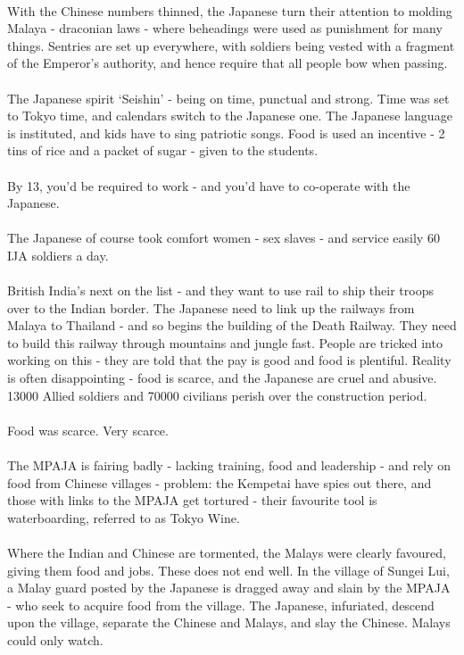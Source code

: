 \documentclass[a4paper]{article}
\begin{document}
\\
With the Chinese numbers thinned, the Japanese turn their attention to molding Malaya - draconian laws - where beheadings were used as punishment for many things. Sentries are set up everywhere, with soldiers being vested with a fragment of the Emperor's authority, and hence require that all people bow when passing.\\
\\
The Japanese spirit `Seishin' - being on time, punctual and strong. Time was set to Tokyo time, and calendars switch to the Japanese one. The Japanese language is instituted, and kids have to sing patriotic songs. Food is used an incentive - 2 tins of rice and a packet of sugar - given to the students.\\
\\
By 13, you'd be required to work - and you'd have to co-operate with the Japanese.\\
\\
The Japanese of course took comfort women - sex slaves - and service easily 60 IJA soldiers a day. \\
\\
British India's next on the list - and they want to use rail to ship their troops over to the Indian border. The Japanese need to link up the railways from Malaya to Thailand - and so begins the building of the Death Railway. They need to build this railway through mountains and jungle fast. People are tricked into working on this - they are told that the pay is good and food is plentiful. Reality is often disappointing - food is scarce, and the Japanese are cruel and abusive. 13000 Allied soldiers and 70000 civilians perish over the construction period.\\
\\
Food was scarce. Very scarce.\\
\\
The MPAJA is fairing badly - lacking training, food and leadership - and rely on food from Chinese villages - problem: the Kempetai have spies out there, and those with links to the MPAJA get tortured - their favourite tool is waterboarding, referred to as Tokyo Wine.\\
\\
Where the Indian and Chinese are tormented, the Malays were clearly favoured, giving them food and jobs. These does not end well. In the village of Sungei Lui, a Malay guard posted by the Japanese is dragged away and slain by the MPAJA - who seek to acquire food from the village. The Japanese, infuriated, descend upon the village, separate the Chinese and Malays, and slay the Chinese. Malays could only watch.\\
\end{document}
